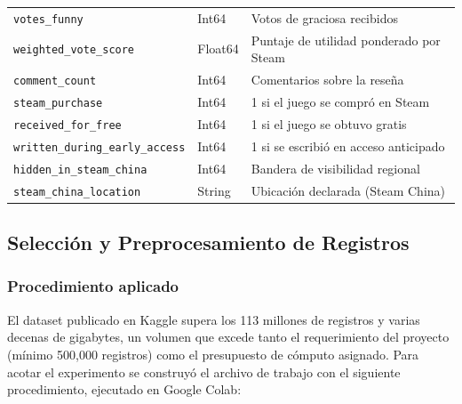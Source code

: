 \begin{table}[H]
\begin{tabular}{llp{7.2cm}}
\texttt{votes\_funny}                  & Int64  & Votos de \guillemotleft{}graciosa\guillemotright{} recibidos \\
\texttt{weighted\_vote\_score}         & Float64& Puntaje de utilidad ponderado por Steam \\
\texttt{comment\_count}                & Int64  & Comentarios sobre la reseña \\
\texttt{steam\_purchase}               & Int64  & 1 si el juego se compró en Steam \\
\texttt{received\_for\_free}           & Int64  & 1 si el juego se obtuvo gratis \\
\texttt{written\_\bk{}during\_\bk{}early\_\bk{}access}& Int64  & 1 si se escribió en acceso anticipado \\
\texttt{hidden\_\bk{}in\_\bk{}steam\_\bk{}china}      & Int64  & Bandera de visibilidad regional \\
\texttt{steam\_\bk{}china\_\bk{}location}        & String & Ubicación declarada (Steam China) \\
\bottomrule
\end{tabular}
\end{table}

\subsection{Selección y Preprocesamiento de Registros}
\label{subsec:muestreo}

\subsubsection{Procedimiento aplicado}

El dataset publicado en Kaggle supera los 113 millones de registros y varias decenas de gigabytes, un volumen que excede tanto el requerimiento del proyecto (mínimo 500,000 registros) como el presupuesto de cómputo asignado. Para acotar el experimento se construyó el archivo de trabajo con el siguiente procedimiento, ejecutado en Google Colab:

